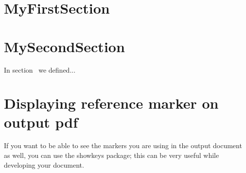 \documentclass{article}
\begin{document}
\section{MyFirstSection} \label{sec:marker}
\section{MySecondSection}
In section~ we defined...

\section{Displaying reference marker on output pdf}
If you want to be able to see the markers you are using in the output document as well, 
you can use the showkeys package; this can be very useful while developing your document.
\end{document}
